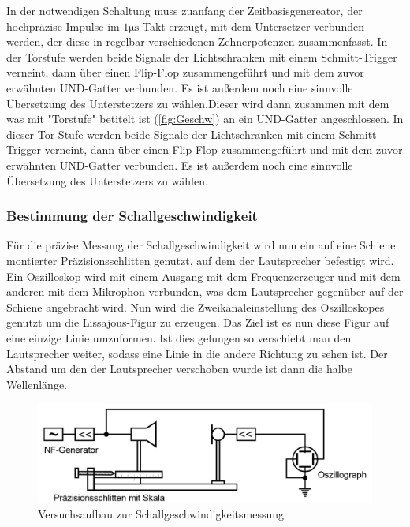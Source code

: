 In der notwendigen Schaltung muss zuanfang der Zeitbasisgenereator, der hochpräzise
Impulse im $ \num{1} \si{\micro\second} $  Takt erzeugt, mit dem Untersetzer verbunden werden,
der diese in regelbar verschiedenen Zehnerpotenzen zusammenfasst. In der Torstufe
werden beide Signale der Lichtschranken mit einem Schmitt-Trigger verneint,
dann über einen Flip-Flop zusammengeführt und mit dem zuvor erwähnten UND-Gatter verbunden.
Es ist außerdem noch eine sinnvolle Übersetzung des Unterstetzers zu wählen.Dieser wird dann zusammen mit dem was mit "Torstufe" betitelt ist (\ref{fig:Geschw}) an ein UND-Gatter angeschlossen.
In dieser Tor Stufe werden beide Signale der Lichtschranken mit einem Schmitt-Trigger verneint, dann über einen Flip-Flop zusammengeführt und mit dem zuvor erwähnten UND-Gatter verbunden.
Es ist außerdem noch eine sinnvolle Übersetzung des Unterstetzers zu wählen.


\subsubsection{Bestimmung der Schallgeschwindigkeit}
\label{subs:Bestimmung der Schallgeschwindigkeit}
Für die präzise Messung der Schallgeschwindigkeit wird nun ein auf eine Schiene montierter Präzisionsschlitten genutzt, auf dem der Lautsprecher befestigt wird.
Ein Oszilloskop wird mit einem Ausgang mit dem Frequenzerzeuger und mit dem anderen mit dem Mikrophon verbunden, was dem Lautsprecher gegenüber auf der Schiene angebracht wird.
Nun wird die Zweikanaleinstellung des Oszilloskopes genutzt um die Lissajous-Figur zu erzeugen. Das Ziel ist es nun diese Figur auf eine einzige Linie umzuformen.
Ist dies gelungen so verschiebt man den Lautsprecher weiter, sodass eine Linie in die andere Richtung zu sehen ist. Der Abstand um den der Lautsprecher verschoben wurde ist dann die halbe Wellenlänge.

\begin{figure}
  \centering
  \includegraphics[width=\textwidth]{Schallgeschwindigkeit.png}
  \caption{Versuchsaufbau zur Schallgeschwindigkeitsmessung}
  \label{fig:Schall}
\end{figure}

